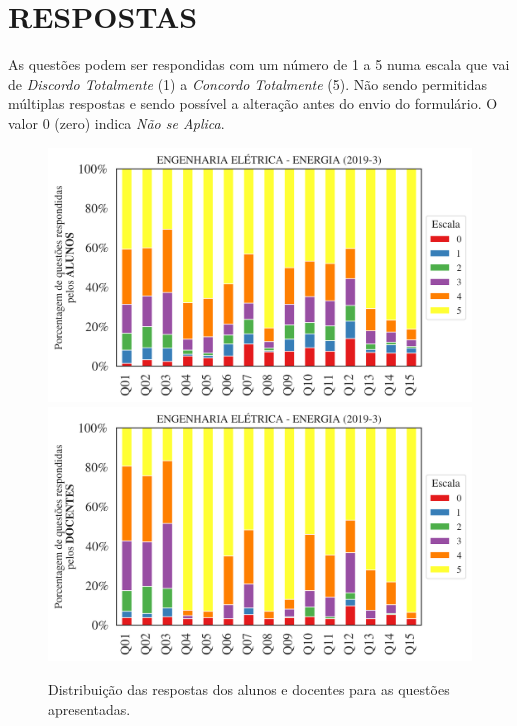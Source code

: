 \documentclass[a4paper,10pt]{article}
\begin{document}
\section{RESPOSTAS}
As questões podem ser respondidas com um número de 1 a 5 numa escala que vai de {\it Discordo Totalmente} (1) a {\it Concordo Totalmente} (5). Não sendo permitidas múltiplas respostas e sendo possível a alteração antes do envio do formulário. O valor 0 (zero) indica {\it Não se Aplica}.


\begin{figure}[h]
\centering
\includegraphics[width=0.999\linewidth]{resposta_alunos_questoes_curso_1109475.png}
\includegraphics[width=0.999\linewidth]{resposta_docentes_questoes_curso_1109475.png}
\caption{\label{fig:resposta_questoes_curso}Distribuição das respostas dos alunos e docentes para as questões apresentadas. }
\end{figure}
\end{document}
